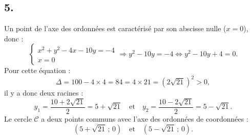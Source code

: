 \subsection*{5.}

Un point de l'axe des ordonnées est caractérisé par son abscisse nulle (\(x = 0\)), donc :
\[
\begin{cases}
x^2 + y^2 - 4x - 10y = -4 \\
x = 0
\end{cases}
\Rightarrow y^2 - 10y = -4
\iff y^2 - 10y + 4 = 0.
\]
Pour cette équation :
\[
\Delta = 100 - 4 \times 4 = 84 = 4 \times 21 = (2\sqrt{21})^2 > 0,
\]
il y a donc deux racines :
\[
y_1 = \frac{10 + 2\sqrt{21}}{2} = 5 + \sqrt{21} \quad \text{et} \quad y_2 = \frac{10 - 2\sqrt{21}}{2} = 5 - \sqrt{21}.
\]
Le cercle \(\mathcal{C}\) a deux points communs avec l'axe des ordonnées de coordonnées :
\[
(5 + \sqrt{21} \,;\, 0) \quad \text{et} \quad (5 - \sqrt{21} \,;\, 0).
\]
